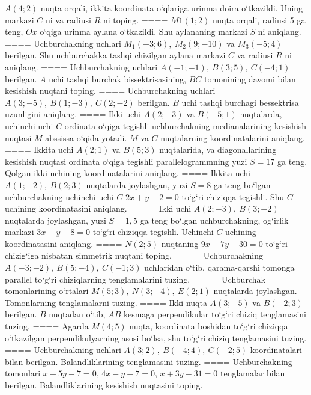 \(A (4;2) \) nuqta orqali, ikkita koordinata o‘qlariga
urinma doira o‘tkazildi. Uning markazi $C$ ni va radiusi
$R$ ni toping.
====
\(M{1} (1; 2) \) nuqta orqali, radiusi 5 ga teng,
$Ox$ o‘qiga urinma aylana o‘tkazildi. Shu aylananing markazi
$S$ ni aniqlang.
====
Uchburchakning uchlari \(M_{1} (- 3;6),\ M_{2} (9; - 10) \)
va \(M_{3} (-5;4) \) berilgan. Shu uchburchakka tashqi chizilgan
aylana markazi $C$ va radiusi $R$ ni aniqlang.
====
Uchburchakning uchlari
\(A (- 1; - 1),\ B (3;5),\ C (- 4;1) \) berilgan. $A$ uchi tashqi
burchak bissektrisasining, $BC$ tomonining davomi bilan kesishish
nuqtani toping.
====
Uchburchakning uchlari
\(A (3; - 5),\ B (1; - 3),\ C (2; - 2) \) berilgan. $B$ uchi tashqi
burchagi bessektrisa uzunligini aniqlang.
====
Ikki uchi \(A (2; - 3) \) va \(B (-5;1) \) nuqtalarda,
uchinchi uchi $C$ ordinata o‘qiga tegishli uchburchakning
medianalarining kesishish nuqtasi $M$ abssissa o‘qida yotadi.
$M$ va $C$ nuqtalarning koordinatalarini aniqlang.
====
Ikkita uchi \(A (2;1) \) va \(B (5; 3) \) nuqtalarida, va
diagonallarining kesishish nuqtasi ordinata o‘qiga tegishli
parallelogrammning yuzi \(S = 17\) ga teng. Qolgan ikki uchining
koordinatalarini aniqlang.
====
Ikkita uchi \(A (1; - 2),\ B (2;3) \) nuqtalarda joylashgan,
yuzi \(S = 8\) ga teng bo‘lgan uchburchakning uchinchi uchi
$C$ \(2x + y - 2 = 0\) to‘g‘ri chiziqqa tegishli. Shu $C$ uchining
koordinatasini aniqlang.
====
Ikki uchi \(A (2; - 3),\ B (3; - 2) \) nuqtalarda
joylashgan, yuzi \(S = 1,5\) ga teng bo‘lgan uchburchakning,
og‘irlik markazi \(3x - y - 8 = 0\) to‘g‘ri chiziqqa tegishli. Uchinchi $C$
uchining koordinatasini aniqlang.
====
\(N (2; 5) \) nuqtaning \(9x - 7y + 30 = 0\) to‘g‘ri chizig‘iga
nisbatan simmetrik nuqtani toping.
====
Uchburchakning \(A (- 3; - 2),\ B (5; - 4),\ C (- 1;3) \)
uchlaridan o‘tib, qarama-qarshi tomonga parallel to‘g‘ri chiziqlarning tenglamalarini
tuzing.
====
Uchburchak tomonlarining o‘rtalari
\(M (5;3),\ N (3; - 4),\ E (2;1) \) nuqtalarda joylashgan. Tomonlarning
tenglamalarni tuzing.
====
Ikki nuqta \(A (3; - 5) \) va \(B (- 2;3) \) berilgan.
$B$ nuqtadan o‘tib, $AB$ kesmaga perpendikular to‘g‘ri chiziq
tenglamasini tuzing.
====
Agarda \(M (4;5) \) nuqta, koordinata boshidan to‘g‘ri chiziqqa
o‘tkazilgan perpendikulyarning asosi bo‘lsa, shu to‘g‘ri chiziq tenglamasini
tuzing.
====
Uchburchakning uchlari
\(A (3;2),\ B (- 4;4),\ C (- 2; 5) \) koordinatalari bilan berilgan.
Balandliklarining tenglamasini tuzing.
====
Uchburchakning tomonlari \(x + 5y - 7 = 0\),
\(4x - y - 7 = 0\), \(x + 3y - 31 = 0\) tenglamalar bilan berilgan.
Balandliklarining kesishish nuqtasini toping.
